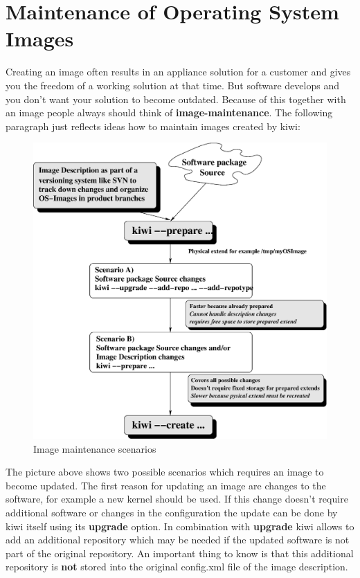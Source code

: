 \chapter{Maintenance of Operating System Images}
\label{chapter:maintain}
\minitoc

Creating an image often results in an appliance solution for a
customer and gives you the freedom of a working solution at that
time. But software develops and you don't want your solution to
become outdated. Because of this together with an image people always
should think of \textbf{image-maintenance}. The following paragraph
just reflects ideas how to maintain images created by kiwi:

\begin{figure}[h]
\centering
\includegraphics[scale=0.5]{pictures/maintain.eps}
\caption{Image maintenance scenarios}
\label{fig:maintenance}
\end{figure}

The picture above shows two possible scenarios which requires an
image to become updated. The first reason for updating an image
are changes to the software, for example a new kernel should be
used. If this change doesn't require additional software or changes
in the configuration the update can be done by kiwi itself using
its \textbf{upgrade} option. In combination with \textbf{upgrade}
kiwi allows to add an additional repository which may be needed if
the updated software is not part of the original repository. An
important thing to know is that this additional repository is \textbf{not}
stored into the original config.xml file of the image description.


